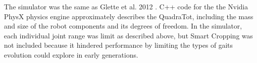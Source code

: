 The simulator was the same as Glette et al. 2012 \cite{glette}. C++ code for the the Nvidia PhysX physics engine approximately describes the QuadraTot, including the mass and size of the robot components and its degrees of freedom. In the simulator, each individual joint range was limit as described above, but Smart Cropping was not included because it hindered performance by limiting the types of gaits evolution could explore in early generations. 



